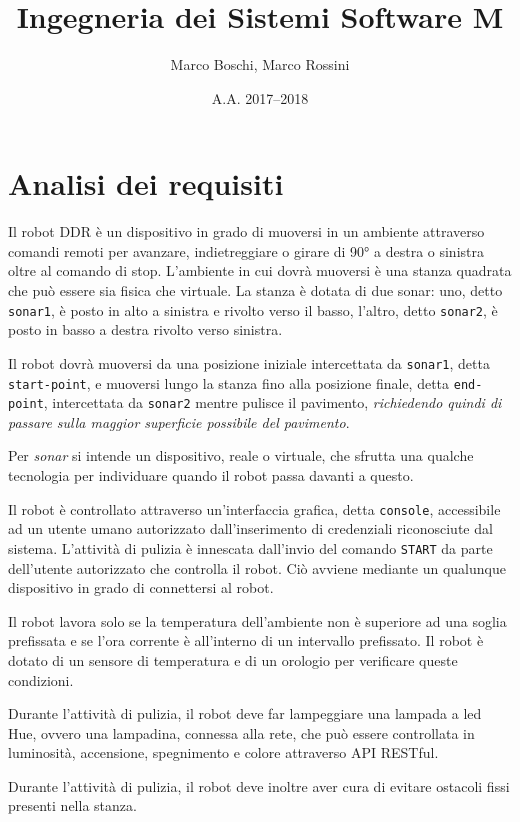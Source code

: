 

\title{Ingegneria dei Sistemi Software M}
\date{A.A. 2017--2018}
\author{Marco Boschi, Marco Rossini}



\maketitletoc

\section{Analisi dei requisiti}
Il robot DDR è un dispositivo in grado di muoversi in un ambiente attraverso comandi remoti per avanzare, indietreggiare o girare di \ang{90} a destra o sinistra oltre al comando di stop. L'ambiente in cui dovrà muoversi è una stanza quadrata che può essere sia fisica che virtuale. La stanza è dotata di due sonar: uno, detto \texttt{sonar1}, è posto in alto a sinistra e rivolto verso il basso, l'altro, detto \texttt{sonar2}, è posto in basso a destra rivolto verso sinistra.

Il robot dovrà muoversi da una posizione iniziale intercettata da \texttt{sonar1}, detta \texttt{start-point}, e muoversi lungo la stanza fino alla posizione finale, detta \texttt{end-point}, intercettata da \texttt{sonar2} mentre pulisce il pavimento, \textit{richiedendo quindi di passare sulla maggior superficie possibile del pavimento}.

Per \textit{sonar} si intende un dispositivo, reale o virtuale, che sfrutta una qualche tecnologia per individuare quando il robot passa davanti a questo.

Il robot è controllato attraverso un'interfaccia grafica, detta \texttt{console}, accessibile ad un utente umano autorizzato dall'inserimento di credenziali riconosciute dal sistema. L'attività di pulizia è innescata dall'invio del comando \texttt{START} da parte dell'utente autorizzato che controlla il robot. Ciò avviene mediante un qualunque dispositivo in grado di connettersi al robot.

Il robot lavora solo se la temperatura dell'ambiente non è superiore ad una soglia prefissata e se l'ora corrente è all'interno di un intervallo prefissato. Il robot è dotato di un sensore di temperatura e di un orologio per verificare queste condizioni.

Durante l'attività di pulizia, il robot deve far lampeggiare una lampada a led Hue, ovvero una lampadina, connessa alla rete, che può essere controllata in luminosità, accensione, spegnimento e colore attraverso API RESTful.

Durante l'attività di pulizia, il robot deve inoltre aver cura di evitare ostacoli fissi presenti nella stanza.

